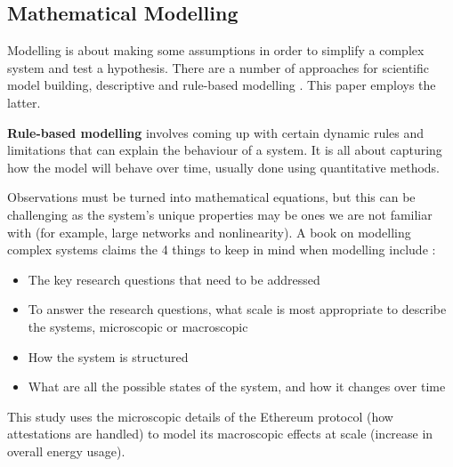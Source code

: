 

\subsection{Mathematical Modelling}
\label{MathematicalModellingLitRev}

Modelling is about making some assumptions in order to simplify a complex system and test a hypothesis. There are a number of approaches for scientific model building, descriptive and rule-based modelling \cite{SayamaINTRODUCTIONSYSTEMS}. This paper employs the latter.

\textbf{Rule-based modelling} involves coming up with certain dynamic rules and limitations that can explain the behaviour of a system. It is all about capturing how the model will behave over time, usually done using quantitative methods.

Observations must be turned into mathematical equations, but this can be challenging as the system's unique properties may be ones we are not familiar with (for example, large networks and nonlinearity). A book on modelling complex systems claims the 4 things to keep in mind when modelling include \cite{SayamaINTRODUCTIONSYSTEMS}:

\begin{itemize}
    \item The key research questions that need to be addressed
    \item To answer the research questions, what scale is most appropriate to describe the systems, microscopic or macroscopic
    \item How the system is structured
    \item What are all the possible states of the system, and how it changes over time
\end{itemize}

This study uses the microscopic details of the Ethereum protocol (how attestations are handled) to model its macroscopic effects at scale (increase in overall energy usage). 




